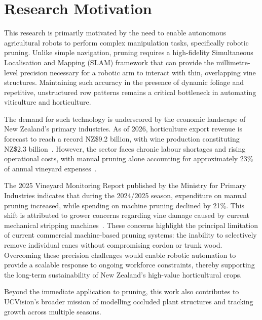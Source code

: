 \section{Research Motivation}
\label{sec:motivation}

This research is primarily motivated by the need to enable autonomous agricultural robots to perform complex manipulation tasks, specifically robotic pruning. Unlike simple navigation, pruning requires a high-fidelity Simultaneous Localisation and Mapping (SLAM) framework that can provide the millimetre-level precision necessary for a robotic arm to interact with thin, overlapping vine structures. Maintaining such accuracy in the presence of dynamic foliage and repetitive, unstructured row patterns remains a critical bottleneck in automating viticulture and horticulture.

The demand for such technology is underscored by the economic landscape of New Zealand's primary industries. As of 2026, horticulture export revenue is forecast to reach a record NZ\$9.2 billion, with wine production constituting NZ\$2.3 billion~\cite{industriesSituationOutlookPrimary2025}. However, the sector faces chronic labour shortages and rising operational costs, with manual pruning alone accounting for approximately 23\% of annual vineyard expenses~\cite{2025MarlboroughVineyard}.

The 2025 Vineyard Monitoring Report published by the Ministry for Primary Industries indicates that during the 2024/2025 season, expenditure on manual pruning increased, while spending on machine pruning declined by 21\%. This shift is attributed to grower concerns regarding vine damage caused by current mechanical stripping machines~\cite{2025MarlboroughVineyard}. These concerns highlight the principal limitation of current commercial machine-based pruning systems: the inability to selectively remove individual canes without compromising cordon or trunk wood. Overcoming these precision challenges would enable robotic automation to provide a scalable response to ongoing workforce constraints, thereby supporting the long-term sustainability of New Zealand’s high-value horticultural crops.

Beyond the immediate application to pruning, this work also contributes to UCVision's broader mission of modelling occluded plant structures and tracking growth across multiple seasons.




